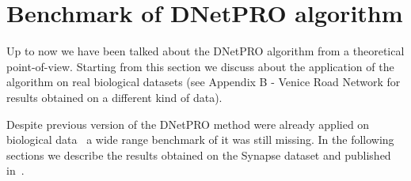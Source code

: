 \documentclass{standalone}
\begin{document}
\section[Benchmark]{Benchmark of DNetPRO algorithm}\label{synapse:benchmark}

Up to now we have been talked about the DNetPRO algorithm from a theoretical point-of-view.
Starting from this section we discuss about the application of the algorithm on real biological datasets (see Appendix B - Venice Road Network for results obtained on a different kind of data).

Despite previous version of the DNetPRO method were already applied on biological data~\cite{PMrna, Scotlandi2009, PMgene, Terragna} a wide range benchmark of it was still missing.
In the following sections we describe the results obtained on the Synapse dataset and published in~\cite{Curti2019}.
\end{document}
